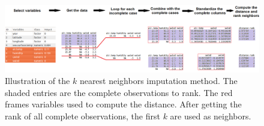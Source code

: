 \documentclass[article]{jss}
\begin{document}
\begin{center}
\begin{figure}[h]
\begin{centering}
\includegraphics[width=1\textwidth]{graph/fig9-diagram}
\par\end{centering}
\caption{Illustration of the $k$ nearest neighbors imputation method. The shaded entries are the complete observations to rank. The red frames variables used to compute the distance. After getting the rank of all complete observations, the first $k$ are used as neighbors. }
\label{fig:neighbor-diagram}
\end{figure}
\par\end{center}
\end{document}

